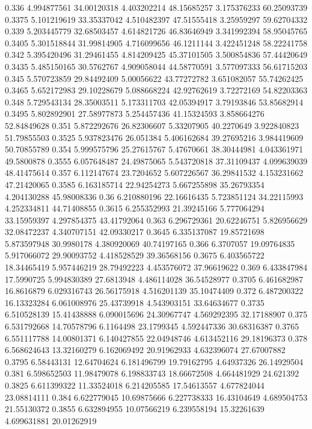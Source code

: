 {0.336 4.994877561 34.00120318 4.403202214 48.15685257 3.175376233 60.25093739
0.3375 5.101219619 33.35337042 4.510482397 47.51555418 3.25959297 59.62704332
0.339 5.203445779 32.68503457 4.614821726 46.83646949 3.341992394 58.95045765
0.3405 5.301518844 31.99814905 4.716099656 46.1211144 3.422451248 58.22241758
0.342 5.395420496 31.29461455 4.814209425 45.37101505 3.500854836 57.44420649
0.3435 5.485150165 30.5762767 4.909058044 44.58770591 3.577097333 56.61715203
0.345 5.570723859 29.84492409 5.00056622 43.77272782 3.651082057 55.74262425
0.3465 5.652172983 29.10228679 5.088668224 42.92762619 3.72272169 54.82203363
0.348 5.729543134 28.35003511 5.173311703 42.05394917 3.79193846 53.85682914
0.3495 5.802892901 27.58977873 5.254457436 41.15324593 3.858664276 52.84849628
0.351 5.872292676 26.82306607 5.33207905 40.2270649 3.922840823 51.79855503
0.3525 5.937823476 26.051384 5.406162684 39.27695216 3.984419609 50.70855789
0.354 5.999575796 25.27615767 5.47670661 38.30444981 4.043361971 49.5800878
0.3555 6.057648487 24.49875065 5.543720818 37.31109437 4.099639039 48.41475614
0.357 6.112147674 23.7204652 5.607226567 36.29841532 4.153231662 47.21420065
0.3585 6.163185714 22.94254273 5.667255898 35.26793354 4.204130288 45.98008336
0.36 6.210880196 22.16616435 5.723851124 34.22115993 4.252334811 44.71408855
0.3615 6.255352993 21.39245166 5.777064294 33.15959397 4.297854375 43.41792064
0.363 6.296729361 20.62246751 5.826956629 32.08472237 4.340707151 42.09330217
0.3645 6.335137087 19.85721698 5.873597948 30.9980178 4.380920069 40.74197165
0.366 6.3707057 19.09764835 5.917066072 29.90093752 4.418528529 39.36568156
0.3675 6.403565722 18.34465419 5.957446219 28.79492223 4.453576072 37.96619622
0.369 6.433847984 17.5990725 5.994830389 27.6813948 4.486114028 36.54528977
0.3705 6.461682987 16.8616879 6.029316743 26.56175918 4.516201139 35.10474409
0.372 6.487200322 16.13323284 6.061008976 25.43739918 4.543903151 33.64634677
0.3735 6.510528139 15.41438888 6.090015696 24.30967747 4.569292395 32.17188907
0.375 6.531792668 14.70578796 6.1164498 23.1799345 4.592447336 30.68316387
0.3765 6.551117788 14.00801371 6.140427855 22.04948746 4.613452116 29.18196373
0.378 6.568624643 13.32160279 6.162069492 20.91962933 4.632396074 27.67007882
0.3795 6.58443131 12.64704624 6.181496799 19.79162795 4.64937326 26.14929504
0.381 6.598652503 11.98479078 6.198833743 18.66672508 4.664481929 24.621392
0.3825 6.611399322 11.33524018 6.214205585 17.54613557 4.677824044 23.08814111
0.384 6.622779045 10.69875666 6.227738333 16.43104649 4.689504753 21.55130372
0.3855 6.632894955 10.07566219 6.239558194 15.32261639 4.699631881 20.01262919
}
